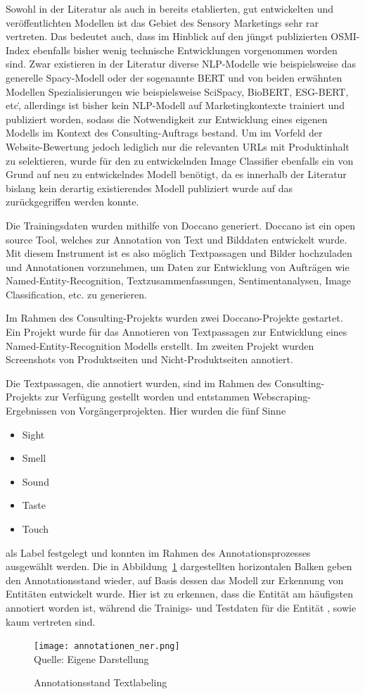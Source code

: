 Sowohl in der Literatur als auch in bereits etablierten, gut entwickelten und veröffentlichten Modellen ist das Gebiet
des Sensory Marketings sehr rar vertreten.
Das bedeutet auch, dass im Hinblick auf den jüngst publizierten \ac{OSMI}-Index ebenfalls bisher wenig technische Entwicklungen
vorgenommen worden sind.
Zwar existieren in der Literatur diverse NLP-Modelle wie beispielsweise das generelle Spacy-Modell oder der sogenannte BERT
und von beiden erwähnten Modellen Spezialisierungen wie beispielsweise SciSpacy, BioBERT, ESG-BERT, etc\., allerdings ist
bisher kein NLP-Modell auf Marketingkontexte trainiert und publiziert worden, sodass die Notwendigkeit zur Entwicklung eines
eigenen Modells im Kontext des Consulting-Auftrags bestand.
Um im Vorfeld der Website-Bewertung jedoch lediglich nur die relevanten URLs mit Produktinhalt zu selektieren, wurde für den zu
entwickelnden Image Classifier ebenfalls ein von Grund auf neu zu entwickelndes Modell benötigt, da es innerhalb der Literatur
bislang kein derartig existierendes Modell publiziert wurde auf das zurückgegriffen werden konnte.

Die Trainingsdaten wurden mithilfe von Doccano generiert.
Doccano ist ein open source Tool, welches zur Annotation von Text und Bilddaten entwickelt wurde.
Mit diesem Instrument ist es also möglich Textpassagen und Bilder hochzuladen und Annotationen vorzunehmen, um Daten zur
Entwicklung von Aufträgen wie Named-Entity-Recognition, Textzusammenfassungen, Sentimentanalysen, Image Classification, etc.
zu generieren.

Im Rahmen des Consulting-Projekts wurden zwei Doccano-Projekte gestartet.
Ein Projekt wurde für das Annotieren von Textpassagen zur Entwicklung eines Named-Entity-Recognition Modells erstellt.
Im zweiten Projekt wurden Screenshots von Produktseiten und Nicht-Produktseiten annotiert.

Die Textpassagen, die annotiert wurden, sind im Rahmen des Consulting-Projekts zur Verfügung gestellt worden und entstammen
Webscraping-Ergebnissen von Vorgängerprojekten.
Hier wurden die fünf Sinne
\begin{itemize}
	\item Sight
	\item Smell
	\item Sound
	\item Taste
	\item Touch
\end{itemize}
als Label festgelegt und konnten im Rahmen des Annotationsprozesses ausgewählt werden.
Die in Abbildung~\ref{fig:annotation_ner} dargestellten horizontalen Balken geben den Annotationsstand wieder, auf Basis dessen
das Modell zur Erkennung von Entitäten entwickelt wurde.
Hier ist zu erkennen, dass die Entität \grqq am häufigsten annotiert worden ist, während die Trainigs- und Testdaten für
die Entität \grqq, \grqq sowie \grqq kaum vertreten sind.
\begin{figure}[H]
	\caption{Annotationsstand Textlabeling}\label{fig:annotation_ner}
	\texttt{[image: annotationen\_ner.png]}
	\\
	Quelle: Eigene Darstellung
\end{figure}

